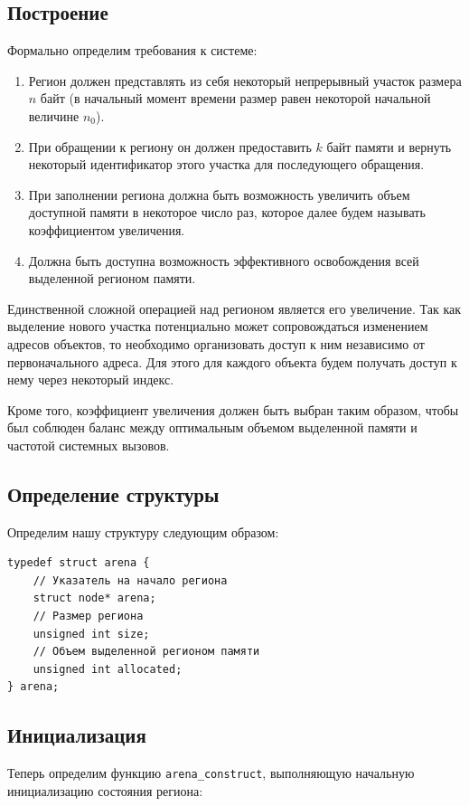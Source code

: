 \documentclass[referat]{SCWorks}
\begin{document}
\subsection{Построение}
Формально определим требования к системе:
\begin{enumerate}
    \item Регион должен представлять из себя некоторый непрерывный участок размера $n$ байт (в начальный момент времени размер равен некоторой начальной величине $n_0$).
    \item При обращении к региону он должен предоставить $k$ байт памяти и вернуть некоторый идентификатор этого участка для последующего обращения.
    \item При заполнении региона должна быть возможность увеличить объем доступной памяти в некоторое число раз, которое далее будем называть коэффициентом увеличения.
    \item Должна быть доступна возможность эффективного освобождения всей выделенной регионом памяти.
\end{enumerate}

Единственной сложной операцией над регионом является его увеличение. Так как выделение нового участка потенциально может сопровождаться изменением адресов объектов, то необходимо организовать доступ к ним независимо от первоначального адреса. Для этого для каждого объекта будем получать доступ к нему через некоторый индекс.

Кроме того, коэффициент увеличения должен быть выбран таким образом, чтобы был соблюден баланс между оптимальным объемом выделенной памяти и частотой системных вызовов.

\subsection{Определение структуры}
Определим нашу структуру следующим образом:

\begin{verbatim}
typedef struct arena {
    // Указатель на начало региона
    struct node* arena;
    // Размер региона
    unsigned int size;
    // Объем выделенной регионом памяти
    unsigned int allocated;
} arena;
\end{verbatim}

\subsection{Инициализация}
Теперь определим функцию \verb|arena_construct|, выполняющую начальную инициализацию состояния региона:
\end{document}
